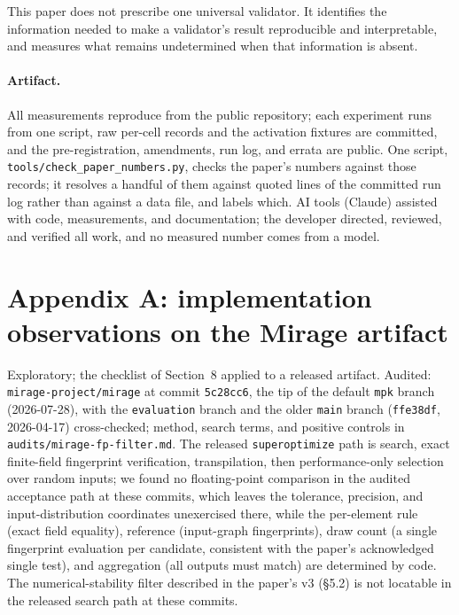 \documentclass[twocolumn,10pt]{article}
\begin{document}
This paper does not prescribe one universal validator. It identifies the
information needed to make a validator's result reproducible and
interpretable, and measures what remains undetermined when that
information is absent.

\paragraph{Artifact.} All measurements reproduce from the public
repository; each experiment runs from one script, raw per-cell records
and the activation fixtures are committed, and the pre-registration,
amendments, run log, and errata are public. One script,
\texttt{tools/check\_paper\_numbers.py}, checks the paper's numbers
against those records; it resolves a handful of them against quoted
lines of the committed run log rather than against a data file, and
labels which. AI tools (Claude) assisted with code, measurements, and
documentation; the developer directed, reviewed, and verified all work,
and no measured number comes from a model.

\section*{Appendix A: implementation observations on the Mirage artifact}

Exploratory; the checklist of Section~8 applied to a released artifact.
Audited: \texttt{mirage-project/mirage} at commit \texttt{5c28cc6}, the
tip of the default \texttt{mpk} branch (2026-07-28), with the
\texttt{evaluation} branch and the older \texttt{main} branch
(\texttt{ffe38df}, 2026-04-17) cross-checked; method, search terms, and
positive controls in \texttt{audits/mirage-fp-filter.md}. The released
\texttt{superoptimize} path is search, exact finite-field fingerprint
verification, transpilation, then performance-only selection over random
inputs; we found no floating-point comparison in the audited
acceptance path at these commits, which leaves the tolerance,
precision, and input-distribution coordinates unexercised there, while
the per-element rule (exact field equality), reference
(input-graph fingerprints), draw count (a single fingerprint evaluation
per candidate, consistent with the paper's acknowledged single test), and
aggregation (all outputs must match) are determined by code. The
numerical-stability filter described in the paper's v3 (\S5.2) is not
locatable in the released search path at these commits.
\end{document}
